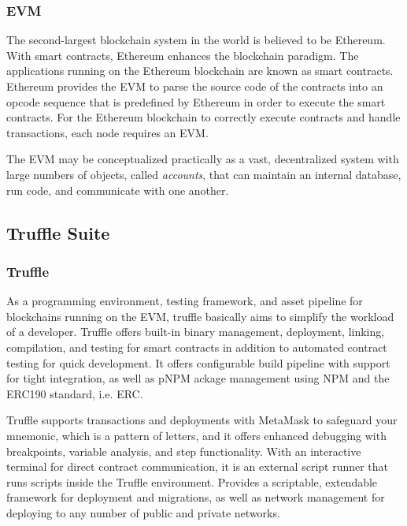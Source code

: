 \subsubsection{\ac{EVM}}

The second-largest blockchain system in the world is believed to be Ethereum. With smart contracts, Ethereum enhances the blockchain paradigm. The applications running on the Ethereum blockchain are known as smart contracts. Ethereum provides the \ac{EVM} to parse the source code of the contracts into an opcode sequence that is predefined by Ethereum in order to execute the smart contracts. For the Ethereum blockchain to correctly execute contracts and handle transactions, each node requires an \ac{EVM}.

\vspace{.5cm}

The \ac{EVM} may be conceptualized practically as a vast, decentralized system with large numbers of objects, called \textit{accounts}, that can maintain an internal database, run code, and communicate with one another.

\subsection{Truffle Suite}
\subsubsection{Truffle}

As a programming environment, testing framework, and asset pipeline for blockchains running on the \ac{EVM}, truffle basically aims to simplify the workload of a developer. Truffle offers built-in binary management, deployment, linking, compilation, and testing for smart contracts in addition to automated contract testing for quick development. It offers configurable build pipeline with support for tight integration, as well as pNPM ackage management using \ac{NPM} and the ERC190 standard, i.e. \ac{ERC}.

\vspace{.5cm}

Truffle supports transactions and deployments with MetaMask to safeguard your mnemonic, which is a pattern of letters, and it offers enhanced debugging with breakpoints, variable analysis, and step functionality.
With an interactive terminal for direct contract communication, it is an external script runner that runs scripts inside the Truffle environment.
Provides a scriptable, extendable framework for deployment and migrations, as well as network management for deploying to any number of public and private networks.

